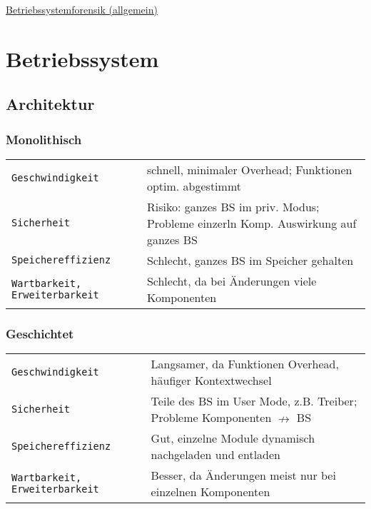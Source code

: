 \begin{center}
     \Large{\underline{Betriebssystemforensik (allgemein)}} \\
\end{center}

\section{Betriebssystem}
\subsection{Architektur}
\subsubsection{Monolithisch}
\begin{tabular}{@{}p{\the\MyLen}%
		@{}p{\linewidth-\the\MyLen}@{}}
	\texttt{Geschwindigkeit} & schnell, minimaler Overhead; Funktionen optim. abgestimmt\\
	\texttt{Sicherheit} & Risiko: ganzes BS im priv. Modus; Probleme einzerln Komp. Auswirkung auf ganzes BS\\
	\texttt{Speichereffizienz} & Schlecht, ganzes BS im Speicher gehalten\\
	\texttt{Wartbarkeit, Erweiterbarkeit} & Schlecht, da bei Änderungen viele Komponenten\\
\end{tabular}

\subsubsection{Geschichtet}
\begin{tabular}{@{}p{\the\MyLen}%
		@{}p{\linewidth-\the\MyLen}@{}}
	\texttt{Geschwindigkeit} & Langsamer, da Funktionen Overhead, häufiger Kontextwechsel\\
	\texttt{Sicherheit} & Teile des BS im User Mode, z.B. Treiber; Probleme Komponenten $\nrightarrow$ BS\\
	\texttt{Speichereffizienz} & Gut, einzelne Module dynamisch nachgeladen und entladen\\
	\texttt{Wartbarkeit, Erweiterbarkeit} & Besser, da Änderungen meist nur bei einzelnen Komponenten\\
\end{tabular}

